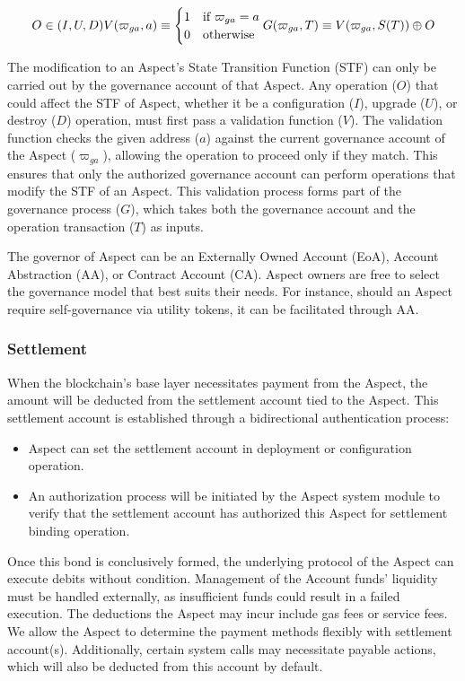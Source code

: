 \[
O \in (I, U, D) \\
V(\varpi_{ga},a) \equiv
\begin{cases}
1 & \text{if } \varpi_{ga} = a \\
0 & \text{otherwise}
\end{cases} \\
G(\varpi_{ga},T) \equiv V(\varpi_{ga},S(T)) \oplus O 
\]

The modification to an Aspect's State Transition Function (STF) can only be carried out by the governance account of that Aspect. Any operation ($O$) that could affect the STF of Aspect, whether it be a configuration ($I$), upgrade ($U$), or destroy ($D$) operation, must first pass a validation function ($V$). The validation function checks the given address ($a$) against the current governance account of the Aspect ($\varpi_{ga}$), allowing the operation to proceed only if they match. This ensures that only the authorized governance account can perform operations that modify the STF of an Aspect. This validation process forms part of the governance process ($G$), which takes both the governance account and the operation transaction ($T$) as inputs.

The governor of Aspect can be an Externally Owned Account (EoA), Account Abstraction (AA), or Contract Account (CA). Aspect owners are free to select the governance model that best suits their needs. For instance, should an Aspect require self-governance via utility tokens, it can be facilitated through AA.

\subsubsection{Settlement}

When the blockchain's base layer necessitates payment from the Aspect, the amount will be deducted from the settlement account tied to the Aspect. This settlement account is established through a bidirectional authentication process:

\begin{itemize}
  \item Aspect can set the settlement account in deployment or configuration operation.
  \item An authorization process will be initiated by the Aspect system module to verify that the settlement account has authorized this Aspect for settlement binding operation.
\end{itemize}

Once this bond is conclusively formed, the underlying protocol of the Aspect can execute debits without condition. Management of the Account funds' liquidity must be handled externally, as insufficient funds could result in a failed execution. The deductions the Aspect may incur include gas fees or service fees. We allow the Aspect to determine the payment methods flexibly with settlement account(s). Additionally, certain system calls may necessitate payable actions, which will also be deducted from this account by default.

